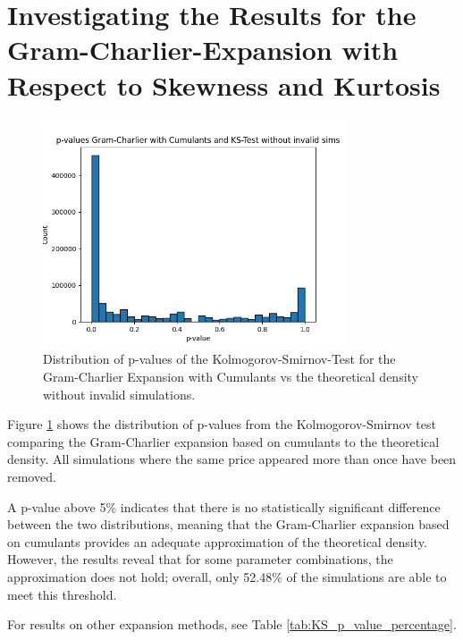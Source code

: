 \section{Investigating the Results for the Gram-Charlier-Expansion with Respect to Skewness and Kurtosis}

\begin{figure}
    \centering
    \includegraphics[width=0.8\textwidth]{img/GC_cum_KS_p_value_histogram.png}
    \caption{Distribution of p-values of the Kolmogorov-Smirnov-Test for the Gram-Charlier Expansion with Cumulants vs the theoretical density without invalid simulations.}
    \label{fig:GC_cum_KS_p_value_histogram}
\end{figure}

Figure \ref{fig:GC_cum_KS_p_value_histogram} shows the distribution of p-values from the Kolmogorov-Smirnov test comparing the Gram-Charlier expansion based on cumulants to the theoretical density. All simulations where the same price appeared more than once have been removed.

A p-value above 5\% indicates that there is no statistically significant difference between the two distributions, meaning that the Gram-Charlier expansion based on cumulants provides an adequate approximation of the theoretical density. However, the results reveal that for some parameter combinations, the approximation does not hold; overall, only 52.48\% of the simulations are able to meet this threshold.

For results on other expansion methods, see Table \ref{tab:KS_p_value_percentage}.


